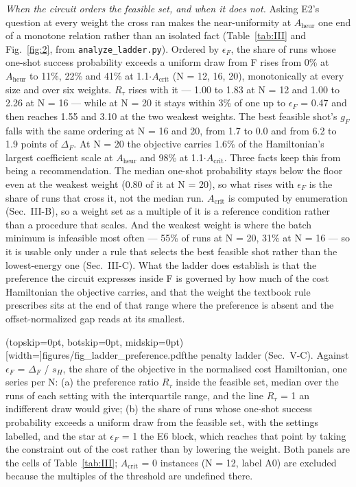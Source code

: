 \documentclass{ieeeaccess}
\begin{document}
\textit{When the circuit orders the feasible set, and when it does not.} Asking E2's question at every weight the cross ran makes the near-uniformity at $A_{\mathrm{heur}}$ one end of a monotone relation rather than an isolated fact (Table~\ref{tab:III} and Fig.~\ref{fig:2}, from \texttt{analyze\_ladder.py}). Ordered by $\epsilon_{F}$, the share of runs whose one-shot success probability exceeds a uniform draw from F rises from 0\% at $A_{\mathrm{heur}}$ to 11\%, 22\% and 41\% at 1.1$\cdot$$A_{\mathrm{crit}}$ (N = 12, 16, 20), monotonically at every size and over six weights. $R_{\tau}$ rises with it --- 1.00 to 1.83 at N = 12 and 1.00 to 2.26 at N = 16 --- while at N = 20 it stays within 3\% of one up to $\epsilon_{F}$ = 0.47 and then reaches 1.55 and 3.10 at the two weakest weights. The best feasible shot's $g_{F}$ falls with the same ordering at N = 16 and 20, from 1.7 to 0.0 and from 6.2 to 1.9 points of $\Delta_{F}$. At N = 20 the objective carries 1.6\% of the Hamiltonian's largest coefficient scale at $A_{\mathrm{heur}}$ and 98\% at 1.1$\cdot$$A_{\mathrm{crit}}$. Three facts keep this from being a recommendation. The median one-shot probability stays below the floor even at the weakest weight (0.80 of it at N = 20), so what rises with $\epsilon_{F}$ is the share of runs that cross it, not the median run. $A_{\mathrm{crit}}$ is computed by enumeration (Sec.~III-B), so a weight set as a multiple of it is a reference condition rather than a procedure that scales. And the weakest weight is where the batch minimum is infeasible most often --- 55\% of runs at N = 20, 31\% at N = 16 --- so it is usable only under a rule that selects the best feasible shot rather than the lowest-energy one (Sec.~III-C). What the ladder does establish is that the preference the circuit expresses inside F is governed by how much of the cost Hamiltonian the objective carries, and that the weight the textbook rule prescribes sits at the end of that range where the preference is absent and the offset-normalized gap reads at its smallest.

\Figure[!t](topskip=0pt, botskip=0pt, midskip=0pt)[width=\textwidth]{figures/fig_ladder_preference.pdf}{the penalty ladder (Sec.~V-C). Against   $\epsilon_{F}$ = $\Delta_{F}$ / $s_{H}$, the share of the objective in the normalised cost Hamiltonian, one series per N:   (a) the preference ratio $R_{\tau}$ inside the feasible set, median over the runs of each setting with   the interquartile range, and the line $R_{\tau}$ = 1 an indifferent draw would give; (b) the share of   runs whose one-shot success probability exceeds a uniform draw from the feasible set, with the   settings labelled, and the star at $\epsilon_{F}$ = 1 the E6 block, which reaches that point by taking the   constraint out of the cost rather than by lowering the weight. Both panels are the cells of   Table~\ref{tab:III}; $A_{\mathrm{crit}}$ = 0 instances (N = 12, label A0) are excluded because the multiples of the   threshold are undefined there.\label{fig:2}}
\end{document}
